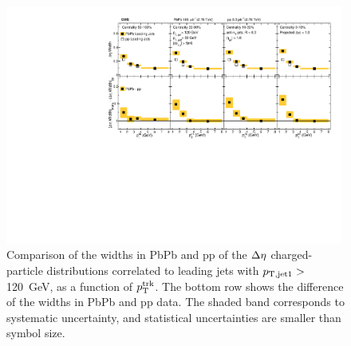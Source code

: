 \begin{figure}[hbtp]
\begin{center}
\includegraphics[width=0.99\textwidth]{figures/Results/Width_Eta_Leading.pdf}
\caption[Leading jet $\Delta\eta$ correlation widths as a function of $p_{\rm T}^{\rm trk}$ at 2.76 TeV]{Comparison of the widths in PbPb and pp of the $\protect\Delta\eta$ charged-particle distributions correlated to leading jets with $p_{\rm T, jet1}>$ 120~GeV, as a function of $p_{\rm T}^{\rm trk}$.  The bottom row shows the difference of the widths in PbPb and pp data.  The shaded band corresponds to systematic uncertainty, and statistical uncertainties are smaller than symbol size.}
\label{fig:Width_eta_lead}
\end{center}
\end{figure}

